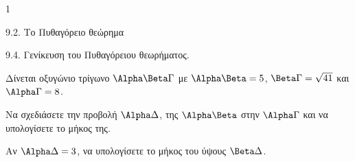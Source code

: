 \begin{ylh}{1}
    \item 9.2. Το Πυθαγόρειο θεώρημα
    \item 9.4. Γενίκευση του Πυθαγόρειου θεωρήματος.
\end{ylh}
Δίνεται οξυγώνιο τρίγωνο $\Alpha\Beta\Gamma$ με $\Alpha\Beta = 5$, $\Beta\Gamma = \sqrt{41}$ και $\Alpha\Gamma = 8$.
\begin{alist}
\item Να σχεδιάσετε την προβολή $\Alpha\Delta$, της $\Alpha\Beta$ στην $\Alpha\Gamma$ και να υπολογίσετε το μήκος της. 
\item Αν $\Alpha\Delta = 3$, να υπολογίσετε το μήκος του ύψους $\Beta\Delta$. 
\end{alist}